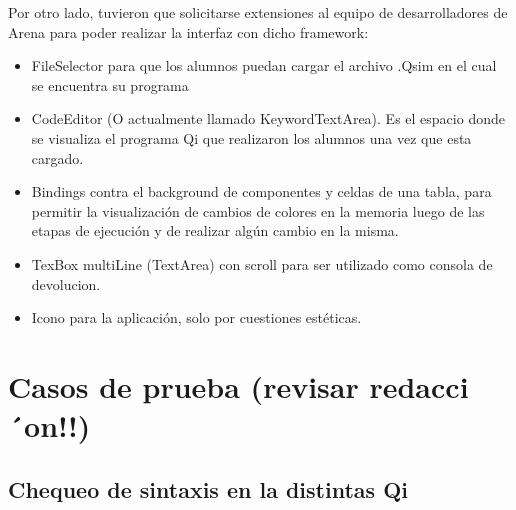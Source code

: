 Por otro lado, tuvieron que solicitarse extensiones al equipo de desarrolladores de Arena para poder realizar la interfaz con dicho framework:

\begin{itemize}
\item FileSelector para que los alumnos puedan cargar el archivo .Qsim en el cual se encuentra su programa
\item CodeEditor (O actualmente llamado KeywordTextArea). Es el espacio donde se visualiza el programa Qi que realizaron los alumnos una vez que esta cargado.
\item Bindings contra el background de componentes y celdas de una tabla, para permitir la visualización de cambios de colores en la memoria luego de las etapas de ejecución y de realizar algún cambio en la misma.
\item TexBox multiLine (TextArea) con scroll para ser utilizado como consola de devolucion.
\item Icono para la aplicación, solo por cuestiones estéticas.
\end{itemize}

\section{Casos de prueba (revisar redacci´on!!)}


\subsection{Chequeo de sintaxis en la distintas Qi}

